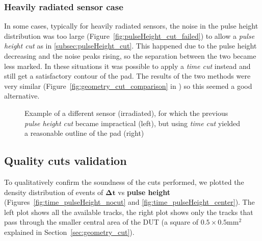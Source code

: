 \subsubsection{Heavily radiated sensor case}\label{subsec:geometry_cut_w/pulse_cut}

In some cases, typically for heavily radiated sensors, the noise in the pulse height distribution was too large (Figure~\ref{fig:pulseHeight_cut_failed}) to allow a \textit{pulse height cut} as in \ref{subsec:pulseHeight_cut}. This happened due to the pulse height decreasing and the noise peaks rising, so the separation between the two became less marked. In these situations it was possible to apply a \textit{time cut} instead and still get a satisfactory contour of the pad. The results of the two methods were very similar (Figure~\ref{fig:geometry_cut_comparison} in ) so this seemed a good alternative.

\begin{figure}[h!tbp]
    \centering
    \hfill
    \centering
    \captionsetup{width=\captionwidth}
    \caption{Example of a different sensor (irradiated), for which the previous \textit{pulse height cut} became impractical (left), but using \textit{time cut} yielded a reasonable outline of the pad (right)}
\end{figure}

\subsection{Quality cuts validation}

To qualitatively confirm the soundness of the cuts performed, we plotted the density distribution of events of \(\boldsymbol{\Delta t}\) vs \textbf{pulse height} (Figures~\ref{fig:time_pulseHeight_nocut} and \ref{fig:time_pulseHeight_center}). The left plot shows all the available tracks, the right plot shows only the tracks that pass through the smaller central area of the DUT (a square of \(0.5\times0.5\unit{\milli\meter^2}\) explained in Section~\ref{sec:geometry_cut}).

